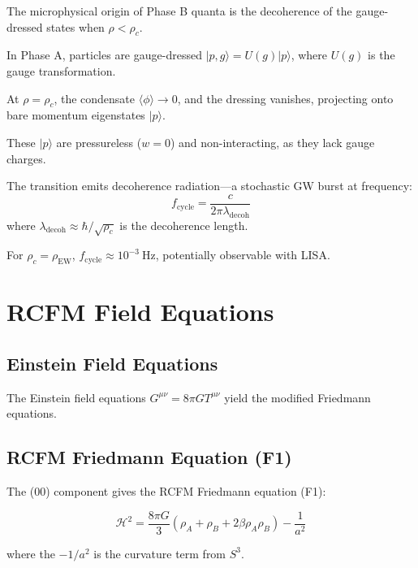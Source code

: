 \documentclass[10pt,twocolumn]{article}
\theoremstyle{definition}
\newcommand{\rhoA}{\rho_{A}}
\newcommand{\rhoB}{\rho_{B}}
\newcommand{\Hcal}{\mathcal{H}}
\newcommand{\rhoc}{\rho_{c}}
\newcommand{\rhoEW}{\rho_{\mathrm{EW}}}
\begin{document}
The microphysical origin of Phase B quanta is the decoherence of the gauge-dressed states when \( \rho < \rhoc \).

In Phase A, particles are gauge-dressed \( |p, g\rangle = U(g) |p\rangle \), where \( U(g) \) is the gauge transformation.

At \( \rho = \rhoc \), the condensate \( \langle \phi \rangle \to 0 \), and the dressing vanishes, projecting onto bare momentum eigenstates \( |p\rangle \).

These \( |p\rangle \) are pressureless (\( w = 0 \)) and non-interacting, as they lack gauge charges.

The transition emits decoherence radiation---a stochastic GW burst at frequency:
\begin{equation}
  f_{\mathrm{cycle}} = \frac{c}{2\pi\lambda_{\mathrm{decoh}}}
  \label{eq:f-cycle}
\end{equation}
where \( \lambda_{\mathrm{decoh}} \approx \hbar / \sqrt{\rhoc} \) is the decoherence length.

For \( \rhoc = \rhoEW \), \( f_{\mathrm{cycle}} \approx 10^{-3} \ \mathrm{Hz} \), potentially observable with LISA.

\section{RCFM Field Equations}
\label{sec:fe}

\subsection{Einstein Field Equations}

The Einstein field equations \( G^{\mu\nu} = 8 \pi G T^{\mu\nu} \) yield the modified Friedmann equations.

\subsection{RCFM Friedmann Equation (F1)}

The (00) component gives the RCFM Friedmann equation (F1):

\begin{equation}
  \Hcal^{2} = \frac{8 \pi G}{3} (\rhoA + \rhoB + 2 \beta \rhoA \rhoB) - \frac{1}{a^{2}}
\end{equation}

where the \( -1/a^{2} \) is the curvature term from \( S^{3} \).
\end{document}
